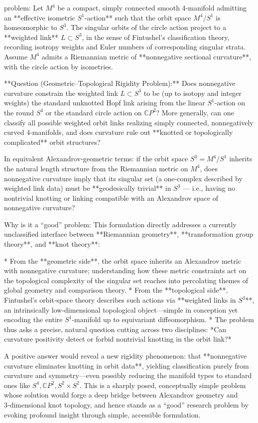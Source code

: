 problem:  
Let \( M^4 \) be a compact, simply connected smooth 4‑manifold admitting an **effective isometric \( S^1 \)-action** such that the orbit space \( M^4 / S^1 \) is homeomorphic to \( S^3 \).  The singular orbits of the circle action project to a **weighted link** \( L \subset S^3 \), in the sense of Fintushel’s classification theory, recording isotropy weights and Euler numbers of corresponding singular strata.  Assume \( M^4 \) admits a Riemannian metric of **nonnegative sectional curvature**, with the circle action by isometries.  

**Question (Geometric–Topological Rigidity Problem):**  
Does nonnegative curvature constrain the weighted link \( L \subset S^3 \) to be (up to isotopy and integer weights) the standard unknotted Hopf link arising from the linear \( S^1 \)-action on the round \( S^4 \) or the standard circle action on \( \mathbb{C}P^2 \)?  
More generally, can one classify all possible weighted orbit links realizing simply connected, nonnegatively curved 4‑manifolds, and does curvature rule out **knotted or topologically complicated** orbit structures?

In equivalent Alexandrov‑geometric terms: if the orbit space \( S^3 = M^4 / S^1 \) inherits the natural length structure from the Riemannian metric on \( M^4 \), does nonnegative curvature imply that its singular set (a one‑complex described by weighted link data) must be **geodesically trivial** in \( S^3 \) — i.e., having no nontrivial knotting or linking compatible with an Alexandrov space of nonnegative curvature?

Why is it a “good” problem:  
This formulation directly addresses a currently unclassified interface between **Riemannian geometry**, **transformation group theory**, and **knot theory**:

* From the **geometric side**, the orbit space inherits an Alexandrov metric with nonnegative curvature; understanding how these metric constraints act on the topological complexity of the singular set reaches into percolating themes of global geometry and comparison theory.  
* From the **topological side**, Fintushel’s orbit‑space theory describes such actions via **weighted links in \( S^3 \)**, an intrinsically low‑dimensional topological object—simple in conception yet encoding the entire \( S^1 \)-manifold up to equivariant diffeomorphism.  
* The problem thus asks a precise, natural question cutting across two disciplines: *Can curvature positivity detect or forbid nontrivial knotting in the orbit link?*

A positive answer would reveal a new rigidity phenomenon: that **nonnegative curvature eliminates knotting in orbit data**, yielding classification purely from curvature and symmetry—even possibly reducing the manifold types to standard ones like \( S^4, \mathbb{C}P^2, S^2\times S^2 \).  
This is a sharply posed, conceptually simple problem whose solution would forge a deep bridge between Alexandrov geometry and 3‑dimensional knot topology, and hence stands as a “good” research problem by evoking profound insight through simple, accessible formulation.